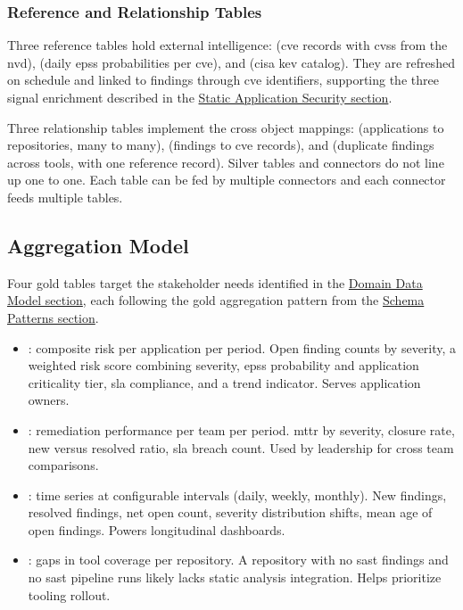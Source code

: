 \subsubsection{Reference and Relationship Tables}

Three reference tables hold external intelligence:  (\gls{cve} records with \gls{cvss} from the \gls{nvd}),  (daily \gls{epss} probabilities per \gls{cve}), and  (\gls{cisa} \gls{kev} catalog). They are refreshed on schedule and linked to findings through \gls{cve} identifiers, supporting the three signal enrichment described in the \hyperref[sec:static-appsec]{Static Application Security section}.

Three relationship tables implement the cross object mappings:  (applications to repositories, many to many),  (findings to \gls{cve} records), and  (duplicate findings across tools, with one reference record). Silver tables and connectors do not line up one to one. Each table can be fed by multiple connectors and each connector feeds multiple tables.


\subsection{Aggregation Model}
\label{sec:aggregation-model}

Four gold tables target the stakeholder needs identified in the \hyperref[sec:data-entities]{Domain Data Model section}, each following the gold aggregation pattern from the \hyperref[sec:schema-patterns]{Schema Patterns section}.

\begin{itemize}
    \item \textbf{}: composite risk per application per period. Open finding counts by severity, a weighted risk score combining severity, \gls{epss} probability and application criticality tier, \gls{sla} compliance, and a trend indicator. Serves application owners.
    \item \textbf{}: remediation performance per team per period. \Gls{mttr} by severity, closure rate, new versus resolved ratio, \gls{sla} breach count. Used by leadership for cross team comparisons.
    \item \textbf{}: time series at configurable intervals (daily, weekly, monthly). New findings, resolved findings, net open count, severity distribution shifts, mean age of open findings. Powers longitudinal dashboards.
    \item \textbf{}: gaps in tool coverage per repository. A repository with no \gls{sast} findings and no \gls{sast} pipeline runs likely lacks static analysis integration. Helps prioritize tooling rollout.
\end{itemize}

